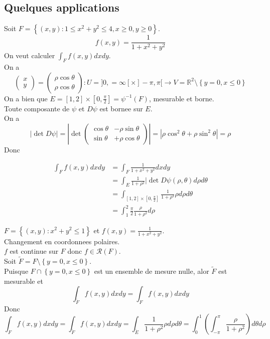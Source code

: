 \documentclass[../main.tex]{subfiles}
\begin{document}
\subsection{Quelques applications }
\begin{exemple}[1]
	Soit $F = \left\{ ( x,y) : 1 \leq  x^{2} + y^{2} \leq  4, x \geq 0, y \geq 0 \right\} $.\\
	\[ 
		f( x,y) = \frac{1}{1+ x^{2}+ y^{2}}
	\]
	On veut calculer $ \int_{ F }^{  }f( x,y) dx dy$.\\
	On a 
	\[ 
\begin{pmatrix}
x\\ y
\end{pmatrix} = \begin{pmatrix}
\rho \cos \theta\\ \rho \cos \theta
\end{pmatrix} : U = ]0, = \infty [  \times ] - \pi, \pi[ \to V = \mathbb{R}^{2} \setminus \left\{ y=0, x \leq 0 \right\} 
	\]
	On a bien que $E = [ 1,2]  \times [ 0, \frac{\pi}{2}]  = \psi^{-1}( F) $, mesurable et borne.\\
	Toute composante de $\psi $ et $D \psi$ est bornee sur $E$.\\
	On a 
	\[ 
	| \det D \psi| = \left| \det \begin{pmatrix}
		\cos \theta & - \rho \sin \theta \\ \sin \theta & + \rho \cos \theta
	\end{pmatrix}\right| = | \rho \cos^{2}\theta + \rho \sin ^{2} \theta | = \rho
	\]
Donc 
	
	\begin{align*}
		\int_{ F }^{  }f( x,y) dx dy &= \int_{ F }^{  } \frac{1}{1+ x^{2} + y^{2}}dx dy\\
					     &= \int_{ E }^{  }\frac{1}{1+ \rho^{2}} | \det D \psi( \rho ,\theta) d \rho d \theta\\
					     &= \int_{ [ 1,2] \times [ 0, \frac{\pi}{2}]  }^{  }\frac{1}{1+ \rho^{2}} \rho d\rho d \theta\\
					     &= \int_{ 1 }^{ 2 } \frac{\pi}{2} \frac{\rho }{1 + \rho ^{2}} d \rho
\end{align*}

	
\end{exemple}
\begin{exemple}[2]
	$F = \left\{ ( x,y) : x^{2} + y^{2} \leq 1 \right\} $ et $f( x,y) = \frac{1}{1+ x^{2} + y^{2}}$.\\
	Changement en coordonnees polaires.\\
	$f$ est continue sur $F$ donc $f \in \mathcal{R}( F) $.\\
	Soit $\tilde F = F \setminus \left\{ y=0, x \leq 0 \right\} $.\\
	Puisque $F \cap \left\{ y=0, x \leq 0 \right\} $ est un ensemble de mesure nulle, alor $\tilde F$ est mesurable et
\[ 
	\int_{ \tilde F }^{  } f( x,y) dx dy = \int_{ F }^{  }f( x,y) dx dy
\]
Donc
\[ 
	\int_{ F }^{  }f( x,y) dx dy = \int_{ \tilde F }^{  }f( x,y)  dx dy = \int_{ \tilde E }^{  } \frac{1}{1+ \rho ^{2}} \rho d \rho d \theta = \int_{ 0 }^{ 1 } ( \int_{ - \pi }^{ \pi } \frac{\rho }{1 + \rho ^{2}}) d\theta d \rho
\]

\end{exemple}
\end{document}
